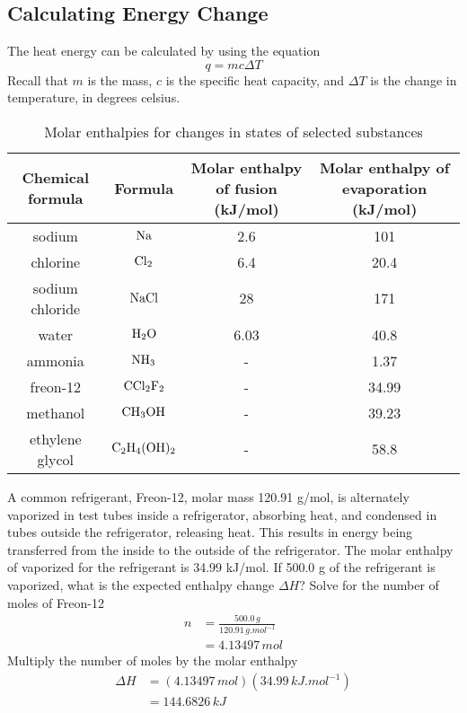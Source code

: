 \subsection{Calculating Energy Change}
The heat energy can be calculated by using the equation
\[
    q=mc\Delta T
\]
Recall that $m$ is the mass, $c$ is the specific heat capacity, and $\Delta T$ is the change in
temperature, in degrees celsius.

\begin{table}[!ht]
    \scriptsize
    \centering
    \caption{Molar enthalpies for changes in states of selected substances}
    \setlength{\tabcolsep}{10pt}      %
    \renewcommand{\arraystretch}{1.2} %
    \begin{tabular}{|c|c|c|c|}
        \hline
        \rowcolor{HeaderColor}
        Chemical formula & Formula & Molar enthalpy of fusion (kJ/mol) & Molar enthalpy of evaporation (kJ/mol) \\ \hline
        sodium & $\ch{Na}$ & 2.6 & 101 \\ \hline
        chlorine & $\ch{Cl2}$ & 6.4 & 20.4 \\ \hline
        sodium chloride & $\ch{NaCl}$ & 28 & 171 \\ \hline
        water & $\ch{H2O}$ & 6.03 & 40.8 \\ \hline
        ammonia & $\ch{NH3}$ & - & 1.37 \\ \hline
        freon-12 & $\ch{CCl2F2}$ & - & 34.99 \\ \hline
        methanol & $\ch{CH3OH}$ & - & 39.23 \\ \hline
        ethylene glycol & $\ch{C2H4(OH)2}$ & - & 58.8 \\ \hline
    \end{tabular}
\end{table}

\begin{sample}{A common refrigerant, Freon-12, molar mass 120.91 g/mol, is alternately vaporized
    in test tubes inside a refrigerator, absorbing heat, and condensed in tubes outside the
    refrigerator, releasing heat. This results in energy being transferred from the inside to
    the outside of the refrigerator. The molar enthalpy of vaporized for the refrigerant is
    34.99 kJ/mol. If 500.0 g of the refrigerant is vaporized, what is the expected enthalpy
    change $\Delta H$?}
    Solve for the number of moles of Freon-12
    \begin{align*}
        n&=\frac{500.0\,\si{g}}{120.91\,\si{g.mol^{-1}}}\\
         &=4.13497\,\si{mol}
    \end{align*}
    Multiply the number of moles by the molar enthalpy
    \begin{align*}
        \Delta H&=(4.13497\,\si{mol})(34.99\,\si{kJ.mol^{-1}})\\
                &=144.6826\,\si{kJ}
    \end{align*}
\end{sample}

